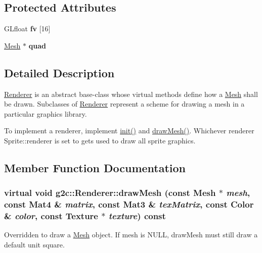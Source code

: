 \subsection*{Protected Attributes}
\begin{DoxyCompactItemize}
\item 
\hypertarget{classg2c_1_1_renderer_a4c3de633fedb9d5e738562a6bf126263}{
GLfloat {\bfseries fv} \mbox{[}16\mbox{]}}
\label{classg2c_1_1_renderer_a4c3de633fedb9d5e738562a6bf126263}

\item 
\hypertarget{classg2c_1_1_renderer_aec68eba790008ede3415b734d891075e}{
\hyperlink{classg2c_1_1_mesh}{Mesh} $\ast$ {\bfseries quad}}
\label{classg2c_1_1_renderer_aec68eba790008ede3415b734d891075e}

\end{DoxyCompactItemize}


\subsection{Detailed Description}
\hyperlink{classg2c_1_1_renderer}{Renderer} is an abstract base-\/class whose virtual methods define how a \hyperlink{classg2c_1_1_mesh}{Mesh} shall be drawn. Subclasses of \hyperlink{classg2c_1_1_renderer}{Renderer} represent a scheme for drawing a mesh in a particular graphics library.

To implement a renderer, implement \hyperlink{classg2c_1_1_renderer_adcfacb02cf062a77f0fb71ab30dbae76}{init()} and \hyperlink{classg2c_1_1_renderer_a60445bc0c7ec75f1c7ee20066c25f8b3}{drawMesh()}. Whichever renderer Sprite::renderer is set to gets used to draw all sprite graphics. 

\subsection{Member Function Documentation}
\hypertarget{classg2c_1_1_renderer_a60445bc0c7ec75f1c7ee20066c25f8b3}{
\subsubsection[{drawMesh}]{\setlength{\rightskip}{0pt plus 5cm}virtual void g2c::Renderer::drawMesh (const {\bf Mesh} $\ast$ {\em mesh}, \/  const Mat4 \& {\em matrix}, \/  const Mat3 \& {\em texMatrix}, \/  const {\bf Color} \& {\em color}, \/  const {\bf Texture} $\ast$ {\em texture}) const}}
\label{classg2c_1_1_renderer_a60445bc0c7ec75f1c7ee20066c25f8b3}
Overridden to draw a \hyperlink{classg2c_1_1_mesh}{Mesh} object. If mesh is NULL, drawMesh must still draw a default unit square. 

